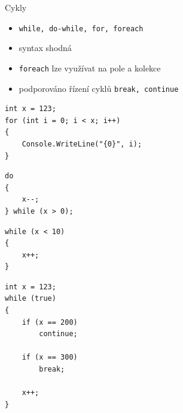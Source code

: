 \begin{frame}[fragile]
\vfill
\begin{block}{Cykly}
\begin{itemize}
\item \lstinline|while, do-while, for, foreach|
\item syntax shodná
\item \lstinline|foreach| lze využívat na pole a kolekce
\item podporováno řízení cyklů \lstinline|break, continue|
\end{itemize}
\end{block}
\vfill
\begin{yesblock}
\begin{lstlisting}
int x = 123;
for (int i = 0; i < x; i++) 
{
    Console.WriteLine("{0}", i);
}
\end{lstlisting}
\end{yesblock}
\vfill
\end{frame}



\begin{frame}[fragile]
\vfill
\begin{yesblock}
\begin{lstlisting}
do
{
    x--;
} while (x > 0);
\end{lstlisting}
\end{yesblock}
\vfill
\begin{yesblock}
\begin{lstlisting}
while (x < 10)
{
    x++;
}
\end{lstlisting}
\end{yesblock}
\vfill
\end{frame}




\begin{frame}[fragile]
\begin{yesblock}
\begin{lstlisting}
int x = 123;
while (true)
{
    if (x == 200)
        continue;

    if (x == 300)
        break;
    
    x++;
}
\end{lstlisting}
\end{yesblock}
\end{frame}





